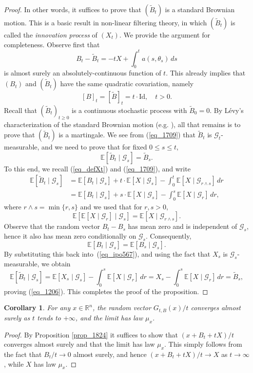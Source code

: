\documentclass[12pt,a4paper]{article}
\newcommand{\E}{\mathbb{E}}
\newcommand{\R}{\mathbb{R}}
\newcommand{\id}{\mathrm{Id}}
\renewcommand{\tilde}{\widetilde}
\newtheorem{corollary}[theorem]{Corollary}
\theoremstyle{definition}
\begin{document}
\begin{proof}
\medskip 
In other words, it suffices to prove that $(\tilde B_t)$ is a standard
Brownian motion. This is a basic result in non-linear filtering theory, in
which $(\tilde B_t)$ is called the \emph{innovation process} of $(X_t)$.
We provide the argument for completeness. Observe first that
\[
B_t-\tilde B_t = - t X + \int_0^t a(s, \theta_s ) \, ds
\]
is almost surely an absolutely-continuous function of $t$.
This already implies that
 $(B_t)$
and $(\tilde B_t)$ have the same quadratic covariation,
namely
\[
[ B]_t = [\tilde B]_t = t \cdot  \id , \quad t >0 .
\]
Recall that $(\tilde B_t)_{t \geq 0}$ is a continuous stochastic process with $\tilde{B}_0 = 0$. 
By L\'evy's characterization of the standard Brownian motion (e.g. \cite[Section 5.3.1]{legall}),
all that remains is to prove that $(\tilde B_t)$ is a martingale. 
We see from (\ref{eq_1709}) that $\tilde B_t$ is $\mathcal G_t$-measurable, and we need to prove that 
for fixed $0 \leq s \leq t$, 
\begin{equation}
\E [ \tilde B_t \mid \mathcal G_s ] = \tilde B_s.
\label{eq_1206}
\end{equation}
To this end, we recall (\ref{eq_defXt}) and (\ref{eq_1709}), and write
\begin{equation}\label{eq_ipo567}
\begin{split}
\E [ \tilde B_{t} \mid \mathcal G_{s} ]
& = \E [ B_{t} \mid \mathcal G_s ] + t \cdot \E [ X \mid \mathcal G_s ]
-\int_0^t  \E [ X \mid \mathcal G_{r\wedge s} ] \, dr \\
& = \E [ B_t \mid \mathcal G_s ] + s \cdot \E [ X \mid \mathcal G_s ]
- \int_0^s \E [ X \mid \mathcal G_r ] \, dr  ,
\end{split}
\end{equation}
where $r \wedge s = \min \{r,s \}$ and we used that for $r,s > 0$, 
\[
\E \left[ \E [ X \mid \mathcal G_{r} ] \mid \mathcal G_{s} \right]
= \E [ X \mid \mathcal G_{r \wedge s} ] .
\]
Observe that the random vector $B_t - B_s$ has mean zero and
is independent of $\mathcal G_s$, hence it also
has mean zero conditionally on $\mathcal G_s$. Consequently,
\[
\E [ B_{t} \mid \mathcal G_s ] = \E [ B_s \mid \mathcal G_s ].
\]
By substituting this back into~(\ref{eq_ipo567}), and using the fact that $X_s$ is
$\mathcal G_s$-measurable, we obtain
\[
\E [ \tilde B_t \mid \mathcal G_s ]
= \E [ X_s \mid \mathcal G_s ] - \int_0^s \E [ X \mid \mathcal G_r ] \, dr
=  X_s - \int_0^s \E [ X \mid \mathcal G_r ] \, dr  = \tilde B_s ,
\]
proving (\ref{eq_1206}). This completes the proof of the proposition.
\end{proof}
%
\begin{corollary} \label{cor_1000}
For any $x\in \R^n$, the random vector $G_{t,B}(x) / t$ converges
almost surely as $t$ tends to $+\infty$, and the limit has
law $\mu_x$.
\end{corollary}
%
\begin{proof}
By Proposition \ref{prop_1824} it suffices to show that
$(x + B_t + t X )/t$ converges almost surely and that the limit has law $\mu_x$. 
This simply follows from the fact that $B_t / t \to 0$ almost surely, and hence 
$(x + B_t + t X )/t \longrightarrow  X$ as $t \longrightarrow  \infty$, while $X$ has law $\mu_x$.
\end{proof}
\end{document}
